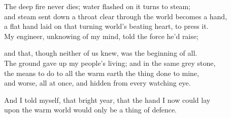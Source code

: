 \begin{founder}
The deep fire never dies; water flashed on it turns to steam;\\
and steam sent down a throat clear through the world becomes a hand,\\
a flat hand laid on that turning world's beating heart, to press it.\\
My engineer, unknowing of my mind, told the force he'd raise;\\
\medskip

and that, though neither of us knew, was the beginning of all.\\
The ground gave up my people's living; and in the same grey stone,\\
the means to do to all the warm earth the thing done to mine,\\
and worse, all at once, and hidden from every watching eye.\\
\medskip

And I told myself, that bright year, that the hand I now could lay\\
upon the warm world would only be a thing of defence.
\end{founder}

\ornament

